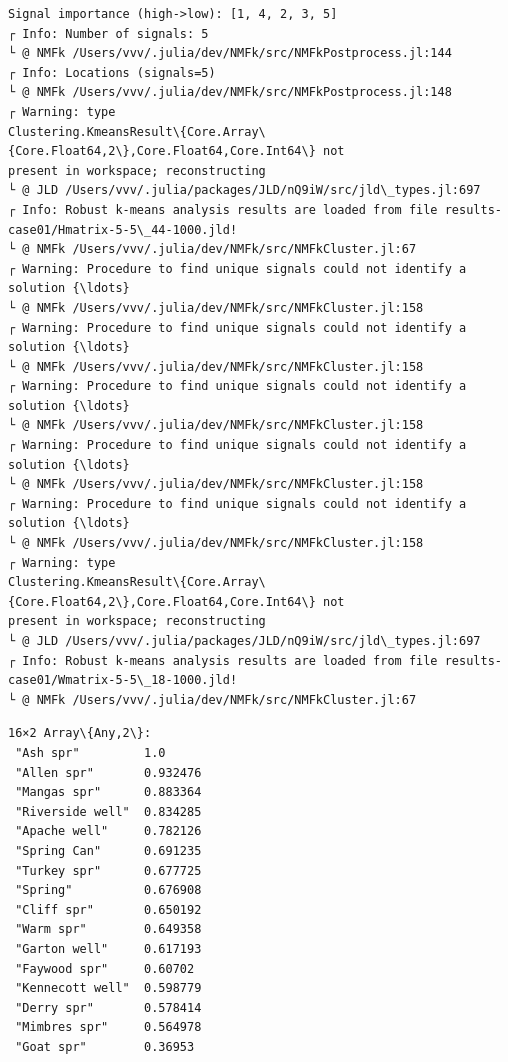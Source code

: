 \documentclass[11pt]{article}
\begin{document}
    \begin{Verbatim}[commandchars=\\\{\}]
Signal importance (high->low): [1, 4, 2, 3, 5]
┌ Info: Number of signals: 5
└ @ NMFk /Users/vvv/.julia/dev/NMFk/src/NMFkPostprocess.jl:144
┌ Info: Locations (signals=5)
└ @ NMFk /Users/vvv/.julia/dev/NMFk/src/NMFkPostprocess.jl:148
┌ Warning: type
Clustering.KmeansResult\{Core.Array\{Core.Float64,2\},Core.Float64,Core.Int64\} not
present in workspace; reconstructing
└ @ JLD /Users/vvv/.julia/packages/JLD/nQ9iW/src/jld\_types.jl:697
┌ Info: Robust k-means analysis results are loaded from file results-
case01/Hmatrix-5-5\_44-1000.jld!
└ @ NMFk /Users/vvv/.julia/dev/NMFk/src/NMFkCluster.jl:67
┌ Warning: Procedure to find unique signals could not identify a solution {\ldots}
└ @ NMFk /Users/vvv/.julia/dev/NMFk/src/NMFkCluster.jl:158
┌ Warning: Procedure to find unique signals could not identify a solution {\ldots}
└ @ NMFk /Users/vvv/.julia/dev/NMFk/src/NMFkCluster.jl:158
┌ Warning: Procedure to find unique signals could not identify a solution {\ldots}
└ @ NMFk /Users/vvv/.julia/dev/NMFk/src/NMFkCluster.jl:158
┌ Warning: Procedure to find unique signals could not identify a solution {\ldots}
└ @ NMFk /Users/vvv/.julia/dev/NMFk/src/NMFkCluster.jl:158
┌ Warning: Procedure to find unique signals could not identify a solution {\ldots}
└ @ NMFk /Users/vvv/.julia/dev/NMFk/src/NMFkCluster.jl:158
┌ Warning: type
Clustering.KmeansResult\{Core.Array\{Core.Float64,2\},Core.Float64,Core.Int64\} not
present in workspace; reconstructing
└ @ JLD /Users/vvv/.julia/packages/JLD/nQ9iW/src/jld\_types.jl:697
┌ Info: Robust k-means analysis results are loaded from file results-
case01/Wmatrix-5-5\_18-1000.jld!
└ @ NMFk /Users/vvv/.julia/dev/NMFk/src/NMFkCluster.jl:67
    \end{Verbatim}

    
    \begin{Verbatim}[commandchars=\\\{\}]
16×2 Array\{Any,2\}:
 "Ash spr"         1.0
 "Allen spr"       0.932476
 "Mangas spr"      0.883364
 "Riverside well"  0.834285
 "Apache well"     0.782126
 "Spring Can"      0.691235
 "Turkey spr"      0.677725
 "Spring"          0.676908
 "Cliff spr"       0.650192
 "Warm spr"        0.649358
 "Garton well"     0.617193
 "Faywood spr"     0.60702
 "Kennecott well"  0.598779
 "Derry spr"       0.578414
 "Mimbres spr"     0.564978
 "Goat spr"        0.36953
    \end{Verbatim}

    
    
\end{document}

